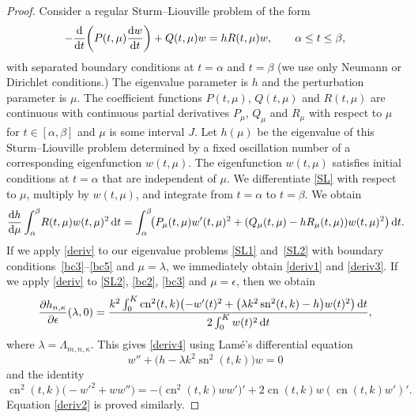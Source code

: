 \documentclass[10pt,a4paper]{amsart}
\DeclareMathOperator{\sn}{sn}
\DeclareMathOperator{\cn}{cn}
\numberwithin{equation}{section}
\begin{document}
\begin{proof}
Consider a regular Sturm--Liouville problem of the form
\begin{equation}\label{SL}
 -\frac{{\rm d}}{{\rm d}t}\biggl(P(t,\mu)\frac{{\rm d}w}{{\rm d}t}\biggr)+ Q(t,\mu) w= h R(t,\mu) w,\qquad \alpha\le t\le \beta,
\end{equation}
with separated boundary conditions at $t=\alpha$ and $t=\beta$ (we use only Neumann or Dirichlet conditions.)
The eigenvalue parameter is $h$ and the perturbation parameter is $\mu$. The coefficient functions $P(t,\mu)$,
$Q(t,\mu)$ and $R(t,\mu)$ are continuous with continuous partial derivatives $P_\mu$, $Q_\mu$ and $R_\mu$ with respect to $\mu$
for $t\in[\alpha,\beta]$ and $\mu$ is some interval $J$. Let $h(\mu)$ be the eigenvalue of this Sturm--Liouville problem
determined by a fixed oscillation number of a corresponding eigenfunction $w(t,\mu)$. The eigenfunction $w(t,\mu)$
satisfies initial conditions at $t=\alpha$ that are independent of $\mu$.
We differentiate \eqref{SL} with respect to $\mu$, multiply by $w(t,\mu)$, and integrate from $t=\alpha$ to $t=\beta$. We obtain
\begin{gather}
 \frac{{\rm d}h}{{\rm d}\mu} \int_\alpha^\beta\! R(t,\mu) w(t,\mu)^2\,{\rm d}t
 =\int_\alpha^\beta\! \bigl(P_\mu(t,\mu)w'(t,\mu)^2+(Q_\mu(t,\mu)-hR_\mu(t,\mu))w(t,\mu)^2\bigr)\,{\rm d}t.\!\label{deriv}
\end{gather}
If we apply \eqref{deriv} to our eigenvalue problems \eqref{SL1} and~\eqref{SL2} with boundary conditions~\eqref{bc3}--\eqref{bc5} and $\mu=\lambda$, we
immediately obtain \eqref{deriv1} and \eqref{deriv3}.
If we apply \eqref{deriv} to \eqref{SL2}, \eqref{bc2}, \eqref{bc3} and $\mu=\epsilon$, then we obtain
\[ \frac{\partial h_{n,\kappa}}{\partial \epsilon}(\lambda,0)=
\frac{k^2\int_0^K \cn^2(t,k) \bigl(-w'(t)^2+\bigl(\lambda k^2\sn^2(t,k)-h\bigr)w(t)^2\bigr)\,{\rm d}t}{2\int_0^K w(t)^2\,{\rm d}t},\]
where $\lambda=\Lambda_{m,n,\kappa}$.
This gives \eqref{deriv4} using Lam\'e's differential equation
\[w''+\bigl(h-\lambda k^2\sn^2(t,k)\bigr)w=0\]
and the identity
\[ \cn^2(t,k)\bigl(-w'^2+w w''\bigr)=-\bigl(\cn^2(t,k)w w'\bigr)'+2\cn(t,k)w(\cn(t,k)w')'. \]
Equation \eqref{deriv2} is proved similarly.
\end{proof}
\end{document}
